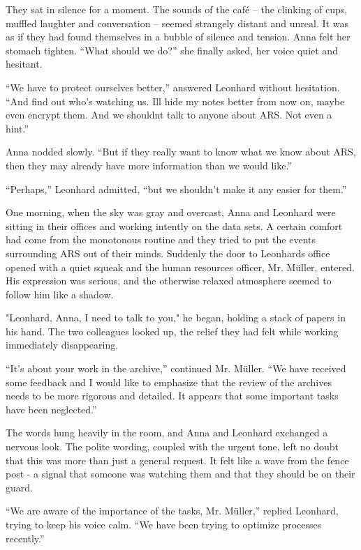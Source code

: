 \documentclass[
]{article}
\begin{document}
They sat in silence for a moment. The sounds of the café -- the clinking
of cups, muffled laughter and conversation -- seemed strangely distant
and unreal. It was as if they had found themselves in a bubble of
silence and tension. Anna felt her stomach tighten. ``What should we
do?'' she finally asked, her voice quiet and hesitant.

``We have to protect ourselves better,'' answered Leonhard without
hesitation. ``And find out who's watching us. I\textquotesingle ll hide
my notes better from now on, maybe even encrypt them. And we
shouldn\textquotesingle t talk to anyone about ARS. Not even a hint.''

Anna nodded slowly. ``But if they really want to know what we know about
ARS, then they may already have more information than we would like.''

``Perhaps,'' Leonhard admitted, ``but we shouldn't make it any easier
for them.''

One morning, when the sky was gray and overcast, Anna and Leonhard were
sitting in their offices and working intently on the data sets. A
certain comfort had come from the monotonous routine and they tried to
put the events surrounding ARS out of their minds. Suddenly the door to
Leonhard\textquotesingle s office opened with a quiet squeak and the
human resources officer, Mr. Müller, entered. His expression was
serious, and the otherwise relaxed atmosphere seemed to follow him like
a shadow.

"Leonhard, Anna, I need to talk to you," he began, holding a stack of
papers in his hand. The two colleagues looked up, the relief they had
felt while working immediately disappearing.

``It's about your work in the archive,'' continued Mr. Müller. ``We have
received some feedback and I would like to emphasize that the review of
the archives needs to be more rigorous and detailed. It appears that
some important tasks have been neglected.''

The words hung heavily in the room, and Anna and Leonhard exchanged a
nervous look. The polite wording, coupled with the urgent tone, left no
doubt that this was more than just a general request. It felt like a
wave from the fence post - a signal that someone was watching them and
that they should be on their guard.

``We are aware of the importance of the tasks, Mr. Müller,'' replied
Leonhard, trying to keep his voice calm. ``We have been trying to
optimize processes recently.''
\end{document}

